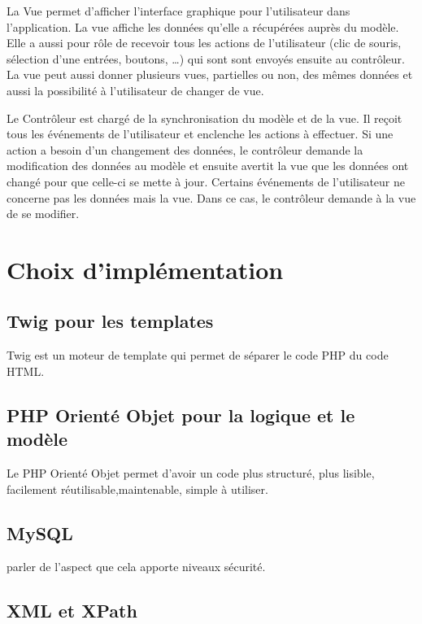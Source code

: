 \documentclass[a4paper,10pt]{report}
\begin{document}
La Vue permet d'afficher l'interface graphique pour l'utilisateur dans l'application.
La vue affiche les données qu'elle a récupérées auprès du modèle. Elle a aussi pour rôle de recevoir tous les actions de l'utilisateur (clic de souris, sélection d'une entrées, boutons, …) qui sont sont envoyés ensuite au contrôleur.
La vue peut aussi donner plusieurs vues, partielles ou non, des mêmes données et aussi la possibilité à l'utilisateur de changer de vue.


Le Contrôleur est chargé de la synchronisation du modèle et de la vue. Il reçoit tous les événements de l'utilisateur et enclenche les actions à effectuer. Si une action a besoin d'un changement des données, le contrôleur demande la modification des données au modèle et ensuite avertit la vue que les données ont changé pour que celle-ci se mette à jour. Certains événements de l'utilisateur ne concerne pas les données mais la vue. Dans ce cas, le contrôleur demande à la vue de se modifier.



\chapter{Choix d'implémentation}

\section{Twig pour les templates }

Twig est un moteur de template qui permet de séparer le code PHP du code HTML.

\section{PHP Orienté Objet pour la logique et le modèle}

Le PHP Orienté Objet permet d'avoir un code plus structuré, plus lisible, facilement réutilisable,maintenable, simple à utiliser. 

\section{MySQL }

parler de l'aspect que cela apporte niveaux sécurité.

\section{XML et XPath}
\end{document}
